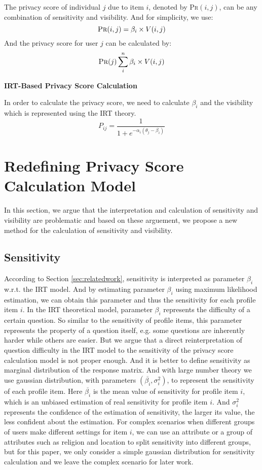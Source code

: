 \documentclass[a4paper]{article}
\begin{document}
The privacy score of individual $j$ due to item $i$, denoted by
\textsc{Pr}$(i, j)$, can be any combination of sensitivity and
visibility. And for simplicity, we use: 
\[
\textsc{Pr}(i,j)=\beta_i\times V(i,j)
\]
And the privacy score for user $j$ can be calculated by: 
\begin{equation}
\label{equ:org:pscore}
\textsc{Pr}(j) \sum_i^n\beta_i\times V(i,j)
\end{equation}

\textbf{IRT-Based Privacy Score Calculation}

In order to calculate the privacy score, we need to calculate
$\beta_i$ and the visibility which is represented using the IRT
theory. 
\begin{equation}
\label{equ:org:irt}
P_{ij}=\frac{1}{1+e^{-\alpha_i(\theta_j-\beta_i)}}
\end{equation}

\section{Redefining Privacy Score Calculation Model \label{sec:redefine}}
In this section, we argue that the interpretation and calculation of
sensitivity and visibility are problematic and based on these
arguement, we propose a new method for the calculation of sensitivity
and visibility.

\subsection{Sensitivity}
According to Section \ref{sec:relatedwork}, sensitivity is interpreted
as parameter $\beta_i$ w.r.t. the IRT model. And by estimating
parameter $\beta_i$ using maximum likelihood estimation, we can obtain
this parameter and thus the sensitivity for each profile item
$i$. In the IRT theoretical model, parameter $\beta_i$
represents the difficulty of a certain question. So similar to the
sensitivity of profile items, this parameter represents the
property of a question itself, e.g. some questions are inherently
harder while others are easier. But we argue that a direct
reinterpretation of question difficulty in the IRT model to the
sensitivity of the privacy score calculation model is not
proper enough. And it is better to define sensitivity as marginal
distribution of the response matrix. And with large number theory we
use gaussian distribution, with parameters $(\overline{\beta_i},\sigma
_i^2)$, to represent the sensitivity of each profile item. Here
$\overline{\beta_i}$ is the mean value of sensitivity for profile item
$i$, which is an unbiased estimation of real sensitivity for profile
item $i$. And $\sigma_i^2$ represents the confidence of the
estimation of sensitivity, the larger its value, the less confident
about the estimation. For complex scenarios when different groups of
users make different settings for item $i$, we can use an attribute or
a group of attributes such as religion and location to split
sensitivity into different groups, but for this paper, we only
consider a simple gaussian distribution for sensitivity calculation
and we leave the complex scenario for later work.
\end{document}
